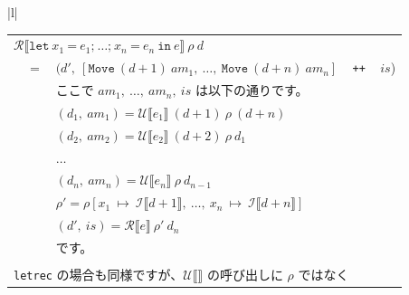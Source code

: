 \documentclass{jbook}
\begin{document}
\begin{tabular} {|l|} \hline
	\begin{tabular}{r c l}
		\multicolumn{3}{l}{$\mathcal{R} \llbracket \texttt{let} ~ x_1 ~ \texttt{=} ~ e_1\texttt{;} ~  \ldots \texttt{;} ~ x_n ~ \texttt{=} ~ e_n ~ \texttt{in} ~ e \rrbracket ~ \rho ~ d$} \\
		 & $=$ & $(d', ~ \left[ \texttt{Move} ~ (d + 1) ~ am_1, ~ \ldots, ~ \texttt{Move} ~ (d + n) ~ am_n \right]$ ~ \texttt{++} ~ $is$)                                                  \\
		 &     & ここで $am_1, ~ \ldots, ~ am_n, ~ is$ は以下の通りです。                                                                                                                  \\
		 &     & $(d_1, ~ am_1) = \mathcal{U} \llbracket e_1 \rrbracket ~ (d + 1) ~ \rho ~ (d + n)$                                                                                        \\
		 &     & $(d_2, ~ am_2) = \mathcal{U} \llbracket e_2 \rrbracket ~ (d + 2) ~ \rho ~ d_1$                                                                                            \\
		 &     & $\ldots$                                                                                                                                                                  \\
		 &     & $(d_n, ~ am_n) = \mathcal{U} \llbracket e_n \rrbracket ~ \rho ~ d_{n - 1}$                                                                                                \\
		 &     & $\rho' = \rho \left[x_1 ~ \mapsto ~ \mathcal{I} \llbracket d + 1 \rrbracket, ~ \ldots , ~ x_n ~ \mapsto ~ \mathcal{I} \llbracket d + n \rrbracket \right]$                \\
		 &     & $(d', ~ is) = \mathcal{R} \llbracket e \rrbracket ~ \rho' ~ d_n$                                                                                                          \\
		 &     & です。                                                                                                                                                                    \\
		\\
		\multicolumn{3}{l}{\texttt{letrec} の場合も同様ですが、$\mathcal{U} \llbracket \rrbracket$ の呼び出しに $\rho$ ではなく}                                                           \\

\end{tabular}
\end{tabular}
\end{document}
